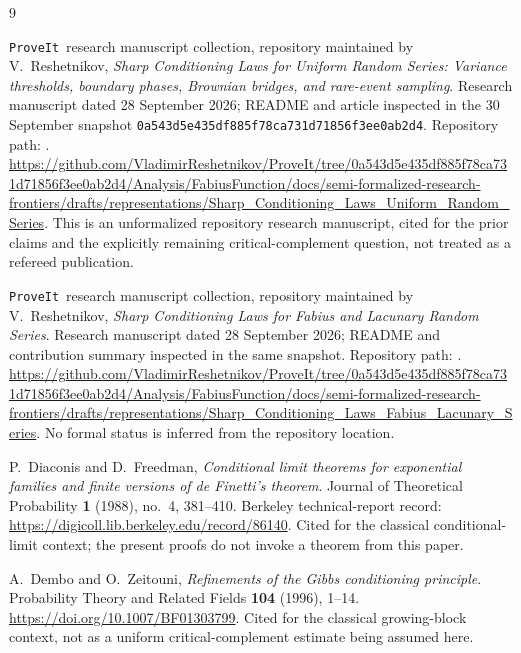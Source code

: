 \documentclass[11pt,a4paper]{article}
\numberwithin{equation}{section}
\theoremstyle{definition}
\theoremstyle{remark}
\newcommand{\repo}{\texttt{ProveIt}}
\newcommand{\snap}{\texttt{0a543d5e435df885f78ca731d71856f3ee0ab2d4}}
\begin{document}
\clearpage
\begin{thebibliography}{9}

\repo\ research manuscript collection, repository maintained by
V.~Reshetnikov,
\emph{Sharp Conditioning Laws for Uniform Random Series:
Variance thresholds, boundary phases, Brownian bridges, and rare-event sampling}.
Research manuscript dated 28 September 2026; README and article inspected
in the 30 September snapshot \snap.
\newblock Repository path:
.
\newblock\url{https://github.com/VladimirReshetnikov/ProveIt/tree/0a543d5e435df885f78ca731d71856f3ee0ab2d4/Analysis/FabiusFunction/docs/semi-formalized-research-frontiers/drafts/representations/Sharp_Conditioning_Laws_Uniform_Random_Series}.
This is an unformalized repository research manuscript, cited for the
prior claims and the explicitly remaining critical-complement question,
not treated as a refereed publication.

\repo\ research manuscript collection, repository maintained by
V.~Reshetnikov,
\emph{Sharp Conditioning Laws for Fabius and Lacunary Random Series}.
Research manuscript dated 28 September 2026; README and contribution
summary inspected in the same snapshot.
\newblock Repository path:
.
\newblock\url{https://github.com/VladimirReshetnikov/ProveIt/tree/0a543d5e435df885f78ca731d71856f3ee0ab2d4/Analysis/FabiusFunction/docs/semi-formalized-research-frontiers/drafts/representations/Sharp_Conditioning_Laws_Fabius_Lacunary_Series}.
No formal status is inferred from the repository location.

P.~Diaconis and D.~Freedman,
\emph{Conditional limit theorems for exponential families and finite
versions of de Finetti's theorem}.
Journal of Theoretical Probability \textbf{1} (1988), no.~4, 381--410.
\newblock Berkeley technical-report record:
\url{https://digicoll.lib.berkeley.edu/record/86140}.
Cited for the classical conditional-limit context; the present proofs
do not invoke a theorem from this paper.

A.~Dembo and O.~Zeitouni,
\emph{Refinements of the Gibbs conditioning principle}.
Probability Theory and Related Fields \textbf{104} (1996), 1--14.
\newblock\url{https://doi.org/10.1007/BF01303799}.
Cited for the classical growing-block context, not as a uniform
critical-complement estimate being assumed here.


\end{thebibliography}
\end{document}
